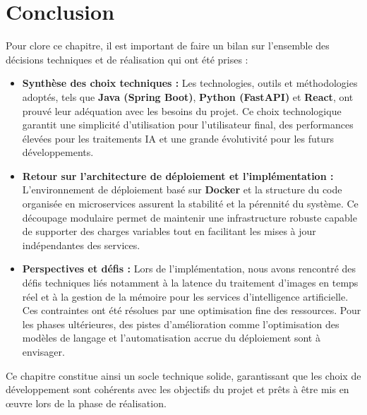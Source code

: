 \section{Conclusion}
Pour clore ce chapitre, il est important de faire un bilan sur l’ensemble des décisions techniques et de réalisation qui ont été prises :

\begin{itemize}
    \item \textbf{Synthèse des choix techniques :} Les technologies, outils et méthodologies adoptés, tels que \textbf{Java (Spring Boot)}, \textbf{Python (FastAPI)} et \textbf{React}, ont prouvé leur adéquation avec les besoins du projet. Ce choix technologique garantit une simplicité d'utilisation pour l'utilisateur final, des performances élevées pour les traitements IA et une grande évolutivité pour les futurs développements.
    
    \item \textbf{Retour sur l’architecture de déploiement et l’implémentation :} L’environnement de déploiement basé sur \textbf{Docker} et la structure du code organisée en microservices assurent la stabilité et la pérennité du système. Ce découpage modulaire permet de maintenir une infrastructure robuste capable de supporter des charges variables tout en facilitant les mises à jour indépendantes des services.
    
    \item \textbf{Perspectives et défis :} Lors de l’implémentation, nous avons rencontré des défis techniques liés notamment à la latence du traitement d'images en temps réel et à la gestion de la mémoire pour les services d'intelligence artificielle. Ces contraintes ont été résolues par une optimisation fine des ressources. Pour les phases ultérieures, des pistes d'amélioration comme l'optimisation des modèles de langage et l'automatisation accrue du déploiement sont à envisager.
\end{itemize}

Ce chapitre constitue ainsi un socle technique solide, garantissant que les choix de développement sont cohérents avec les objectifs du projet et prêts à être mis en œuvre lors de la phase de réalisation.
